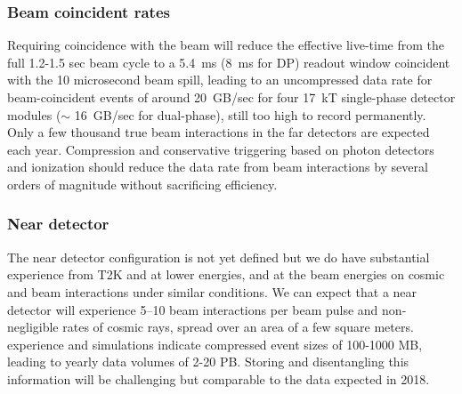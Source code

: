 \subsubsection{Beam coincident rates}

Requiring  coincidence with the  beam will reduce the effective live-time from the full 1.2-1.5 sec beam cycle to a 5.4~ms (8~ms for DP)  readout window coincident with the 10 microsecond beam spill, leading to an uncompressed data rate for beam-coincident events of around 20~GB/sec for four 17~kT single-phase detector modules ($\sim$ 16~GB/sec for dual-phase), still too high to record permanently.
Only a few thousand true beam interactions in the far detectors are expected each year.  Compression and conservative triggering based on photon detectors and ionization should reduce the data rate from beam interactions by several orders of magnitude without sacrificing efficiency.

\subsubsection{ Near detector} The near detector configuration is not yet defined  but we do have substantial experience from T2K and   at lower energies, and   at the   beam energies on cosmic and beam interactions under similar conditions.  We can expect that a near detector will experience \numrange{5}{10} beam interactions per beam pulse and non-negligible rates of cosmic rays, spread over an area of a few square meters.  experience and  simulations indicate compressed event sizes of 100-1000 MB, leading to yearly data volumes of 2-20 PB.  Storing and disentangling this information will be challenging but comparable to the  data expected in 2018.%




